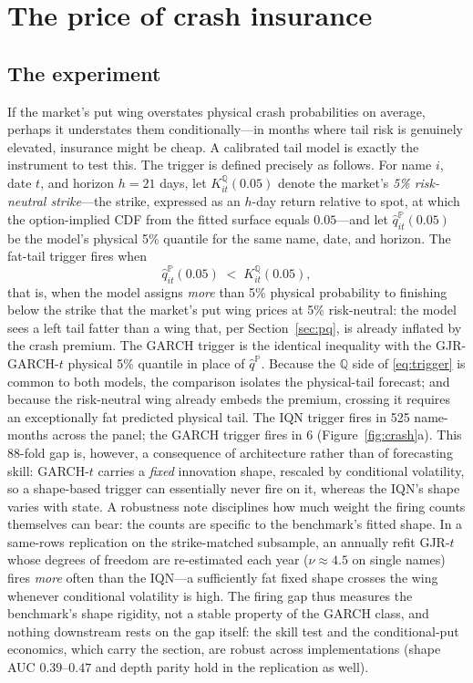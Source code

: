 \documentclass[11pt]{article}
\newcommand{\Q}{\mathbb{Q}}
\newcommand{\PP}{\mathbb{P}}
\begin{document}
\section{The price of crash insurance}\label{sec:crash}

\subsection{The experiment}\label{sec:crashexp}
If the market's put wing overstates physical crash probabilities on average, perhaps it understates them conditionally---in months where tail risk is genuinely elevated, insurance might be cheap. A calibrated tail model is exactly the instrument to test this. The trigger is defined precisely as follows. For name $i$, date $t$, and horizon $h=21$ days, let $K^{\Q}_{it}(0.05)$ denote the market's \emph{5\% risk-neutral strike}---the strike, expressed as an $h$-day return relative to spot, at which the option-implied CDF from the fitted surface equals $0.05$---and let $\hat q^{\PP}_{it}(0.05)$ be the model's physical 5\% quantile for the same name, date, and horizon. The fat-tail trigger fires when
\begin{equation}
\hat q^{\PP}_{it}(0.05) \;<\; K^{\Q}_{it}(0.05),
\label{eq:trigger}
\end{equation}
that is, when the model assigns \emph{more} than 5\% physical probability to finishing below the strike that the market's put wing prices at 5\% risk-neutral: the model sees a left tail fatter than a wing that, per Section~\ref{sec:pq}, is already inflated by the crash premium. The GARCH trigger is the identical inequality with the GJR-GARCH-$t$ physical 5\% quantile in place of $\hat q^{\PP}$. Because the $\Q$ side of \eqref{eq:trigger} is common to both models, the comparison isolates the physical-tail forecast; and because the risk-neutral wing already embeds the premium, crossing it requires an exceptionally fat predicted physical tail. The IQN trigger fires in 525 name-months across the panel; the GARCH trigger fires in 6 (Figure~\ref{fig:crash}a). This $88$-fold gap is, however, a consequence of architecture rather than of forecasting skill: GARCH-$t$ carries a \emph{fixed} innovation shape, rescaled by conditional volatility, so a shape-based trigger can essentially never fire on it, whereas the IQN's shape varies with state. A robustness note disciplines how much weight the firing counts themselves can bear: the counts are specific to the benchmark's fitted shape. In a same-rows replication on the strike-matched subsample, an annually refit GJR-$t$ whose degrees of freedom are re-estimated each year ($\nu \approx 4.5$ on single names) fires \emph{more} often than the IQN---a sufficiently fat fixed shape crosses the wing whenever conditional volatility is high. The firing gap thus measures the benchmark's shape rigidity, not a stable property of the GARCH class, and nothing downstream rests on the gap itself: the skill test and the conditional-put economics, which carry the section, are robust across implementations (shape AUC $0.39$--$0.47$ and depth parity hold in the replication as well).
\end{document}
